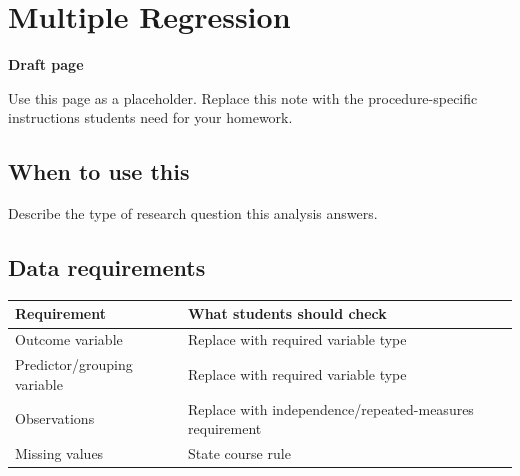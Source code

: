 \documentclass[
  letterpaper,
  DIV=11,
  numbers=noendperiod]{scrreprt}
\newcounter{none} %
\begin{document}
\chapter{Multiple Regression}\label{multiple-regression}

\begin{tcolorbox}[enhanced jigsaw, arc=.35mm, bottomrule=.15mm, breakable, colback=white, colframe=quarto-callout-note-color-frame, left=2mm, leftrule=.75mm, opacityback=0, rightrule=.15mm, toprule=.15mm]
\begin{minipage}[t]{5.5mm}
\textcolor{quarto-callout-note-color}{\faInfo}
\end{minipage}%
\begin{minipage}[t]{\textwidth - 5.5mm}

\vspace{-3mm}\textbf{Draft page}\vspace{3mm}

Use this page as a placeholder. Replace this note with the
procedure-specific instructions students need for your homework.

\end{minipage}%
\end{tcolorbox}

\section{When to use this}\label{when-to-use-this-10}

Describe the type of research question this analysis answers.

\section{Data requirements}\label{data-requirements-11}

{\def\LTcaptype{none} %
\begin{longtable}[]{@{}
  >{\raggedright\arraybackslash}p{}
  >{\raggedright\arraybackslash}p{}@{}}
\toprule\noalign{}
\begin{minipage}[b]{\linewidth}\raggedright
Requirement
\end{minipage} & \begin{minipage}[b]{\linewidth}\raggedright
What students should check
\end{minipage} \\
\midrule\noalign{}
\endhead
\bottomrule\noalign{}
\endlastfoot
Outcome variable & Replace with required variable type \\
Predictor/grouping variable & Replace with required variable type \\
Observations & Replace with independence/repeated-measures
requirement \\
Missing values & State course rule \\
\end{longtable}
}
\end{document}
